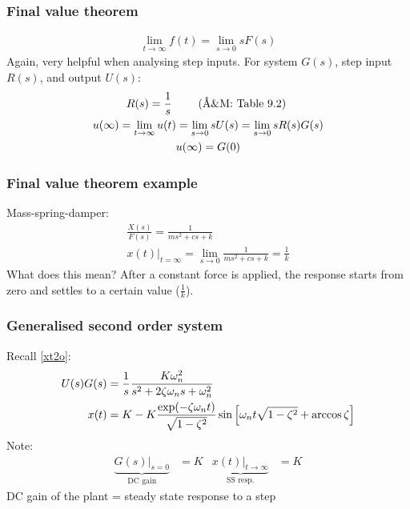 \documentclass[10pt]{beamer-control}
\begin{document}
\begin{frame}
  \frametitle{Final value theorem}

  \begin{gather}
    \lim_{t\to\infty} f(t) = \lim_{s\to0} s F(s)
  \end{gather}
  Again, very helpful when analysing step inputs. For system $G(s)$, step input $R(s)$, and output $U(s)$:
  \begin{gather}
    R(s) = \frac{1}{s} \qquad\text{\AMref{Table 9.2}}\\
    u(\infty) = \lim_{t\to\infty} u(t) = \lim_{s\to0} s U(s) = \lim_{s\to0} s R(s)G(s) \\
    u(\infty) = G(0)
  \end{gather}
\end{frame}

\begin{frame}
  \frametitle{Final value theorem example}

  Mass-spring-damper:
  \begin{gather}
    \frac{X(s)}{F(s)} = \frac{1}{ms^2+cs+k} \\
    x(t)|_{t=\infty} = \lim_{s\to0} \frac{1}{ms^2+cs+k} = \frac{1}{k}
  \end{gather}
  What does this mean? After a constant force is applied, the response starts from zero and settles to a certain value ($\frac{1}{k}$).

  \bigskip
\end{frame}

\begin{frame}
  \frametitle{Generalised second order system}
  Recall \eqref{xt2o}:
  \begin{align}
    U(s)G(s) & = \frac{1}{s}\frac{K\omega_n^2}{s^2+2\zeta\omega_ns+\omega_n^2} \\
    x(t) &= K - K\frac{\exp(-\zeta\omega_n t)}{\sqrt{1-\zeta^2}}\sin\left[\omega_n t\sqrt{1-\zeta^2}+\arccos\zeta\right]
  \end{align}
  Note:
  \begin{align}
    \underbrace{G(s)|_{s=0}}_{\text{DC gain}} &= K & \underbrace{x(t)|_{t\to \infty}}_{\text{SS resp.}} &= K
  \end{align}
  DC gain of the plant = steady state response to a step
\end{frame}

\SUMMARYFRAME
\FINALE
\end{document}

